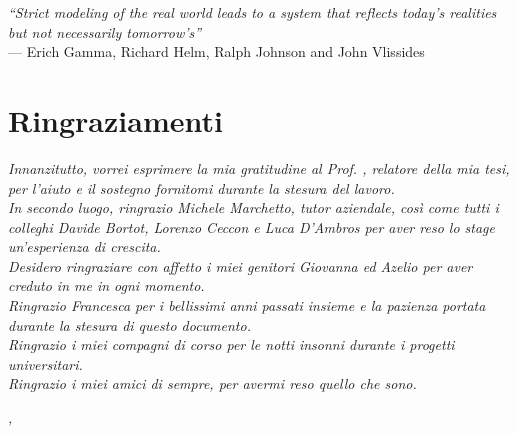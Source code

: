 
{}
{}

\begin{flushright}{
	\slshape  
	``Strict modeling of the real world leads to a system that reflects today's realities but not necessarily tomorrow's''} \\ 
	\medskip
    --- Erich Gamma, Richard Helm, Ralph Johnson and John Vlissides
\end{flushright}


\bigskip

\begingroup
\let\clearpage\relax
\let\cleardoublepage\relax
\let\cleardoublepage\relax

\chapter*{Ringraziamenti}

\noindent \textit{Innanzitutto, vorrei esprimere la mia gratitudine al Prof. \myProf, relatore della mia tesi, per l'aiuto e il sostegno fornitomi durante la stesura del lavoro.}\\

\noindent \textit{In secondo luogo, ringrazio Michele Marchetto, tutor aziendale, così come tutti i colleghi Davide Bortot, Lorenzo Ceccon e Luca D'Ambros per aver reso lo stage un'esperienza di crescita.}\\

\noindent \textit{Desidero ringraziare con affetto i miei genitori Giovanna ed Azelio per aver creduto in me in ogni momento.}\\

\noindent \textit{Ringrazio Francesca per i bellissimi anni passati insieme e la pazienza portata durante la stesura di questo documento.}\\

\noindent \textit{Ringrazio i miei compagni di corso per le notti insonni durante i progetti universitari.}\\

\noindent \textit{Ringrazio i miei amici di sempre, per avermi reso quello che sono.}\\


\bigskip

\noindent\textit{\myLocation, \myTime}
\hfill \myName

\endgroup

